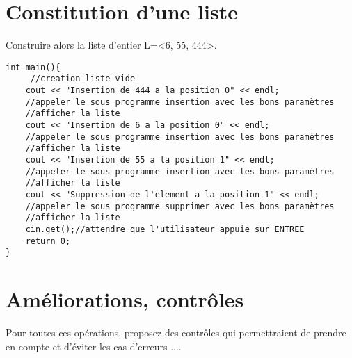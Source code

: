 \documentclass[french]{article}
\begin{document}
	\section{Constitution d’une liste}
	Construire alors la liste d’entier L=<6, 55, 444>.
	
	\begin{lstlisting}
int main(){
     //creation liste vide
    cout << "Insertion de 444 a la position 0" << endl;
    //appeler le sous programme insertion avec les bons paramètres
    //afficher la liste
    cout << "Insertion de 6 a la position 0" << endl;
    //appeler le sous programme insertion avec les bons paramètres
    //afficher la liste
    cout << "Insertion de 55 a la position 1" << endl;
    //appeler le sous programme insertion avec les bons paramètres
    //afficher la liste
    cout << "Suppression de l'element a la position 1" << endl;
    //appeler le sous programme supprimer avec les bons paramètres
    //afficher la liste
    cin.get();//attendre que l'utilisateur appuie sur ENTREE
    return 0;	 
}
\end{lstlisting}
	
	\section{Améliorations, contrôles}
	Pour toutes ces opérations, proposez des contrôles qui permettraient de prendre en compte et d’éviter les cas d’erreurs ....
\end{document}
